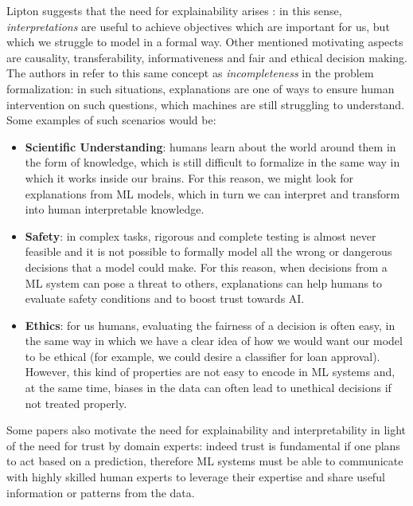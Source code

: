 Lipton \cite{lipton2017mythos} suggests that the need for explainability arises : in this sense, \textit{interpretations} are useful to achieve objectives which are important for us, but which we struggle to model in a formal way. Other mentioned motivating aspects are causality, transferability, informativeness and fair and ethical decision making.
 The authors in \cite{doshivelez2017rigorous} refer to this same concept as \textit{incompleteness} in the problem formalization: in such situations, explanations are one of ways to ensure human intervention on such questions, which machines are still struggling to understand. Some examples of such scenarios would be:
\begin{itemize}
	\item \textbf{Scientific Understanding}: humans learn about the world around them in the form of knowledge, which is still difficult to formalize in the same way in which it works inside our brains. For this reason, we might look for explanations from ML models, which in turn we can interpret and transform into human interpretable knowledge.
	\item \textbf{Safety}: in complex tasks, rigorous and complete testing is almost never feasible and it is not possible to formally model all the wrong or dangerous decisions that a model could make. For this reason, when decisions from a ML system can pose a threat to others, explanations can help humans to evaluate safety conditions and to boost trust towards AI.
	\item \textbf{Ethics}: for us humans, evaluating the fairness of a decision is often easy, in the same way in which we have a clear idea of how we would want our model to be ethical (for example, we could desire a  classifier for loan approval). However, this kind of properties are not easy to encode in ML systems and, at the same time, biases in the data can often lead to unethical decisions if not treated properly. 
\end{itemize}

Some papers \cite{Kim2015InteractiveAI, ribeiro2016trust} also motivate the need for explainability and interpretability in light of the need for trust by domain experts: indeed trust is fundamental if one plans to act based on a prediction, therefore ML systems must be able to communicate with highly skilled human experts to leverage their expertise and share useful information or patterns from the data. 

